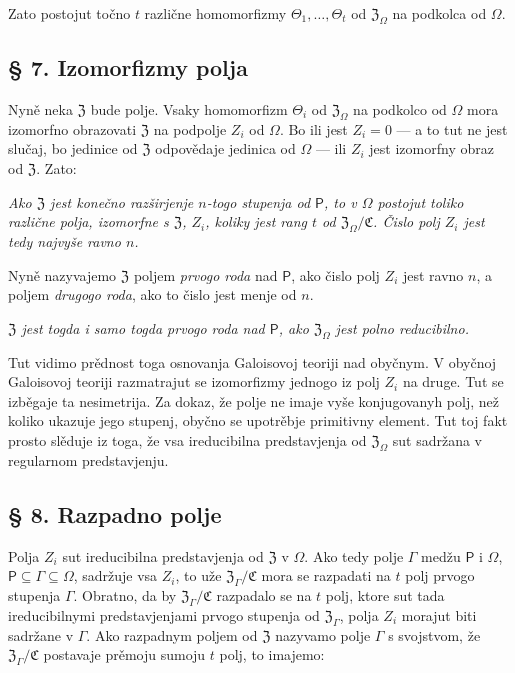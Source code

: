 \documentclass[11pt]{article}
\begin{document}
Zato postojut točno \(t\) različne homomorfizmy \(\Theta_1,\ldots,\Theta_t\) od \(\mathfrak Z_\Omega\) na podkolca od \(\Omega\).

\subsection*{§ 7. Izomorfizmy polja}\label{die-isomorphismen-eines-koerpers}

Nyně neka \(\mathfrak Z\) bude polje. Vsaky homomorfizm \(\Theta_i\) od \(\mathfrak Z_\Omega\) na podkolco od \(\Omega\) mora izomorfno obrazovati \(\mathfrak Z\) na podpolje \(Z_i\) od \(\Omega\). Bo ili jest \(Z_i=0\) --- a to tut ne jest slučaj, bo jedinice od \(\mathfrak Z\) odpovědaje jedinica od \(\Omega\) --- ili \(Z_i\) jest izomorfny obraz od \(\mathfrak Z\). Zato:

\emph{Ako \(\mathfrak Z\) jest konečno razširjenje \(n\)-togo stupenja od \(\mathsf P\), to v \(\Omega\) postojut toliko različne polja, izomorfne s \(\mathfrak Z\), \(Z_i\), koliky jest rang \(t\) od \(\mathfrak Z_\Omega/\mathfrak C\). Čislo polj \(Z_i\) jest tedy najvyše ravno \(n\).}

Nyně nazyvajemo \(\mathfrak Z\) poljem \emph{prvogo roda} nad \(\mathsf P\), ako čislo polj \(Z_i\) jest ravno \(n\), a poljem \emph{drugogo roda}, ako to čislo jest menje od \(n\).

\emph{\(\mathfrak Z\) jest togda i samo togda prvogo roda nad \(\mathsf P\), ako \(\mathfrak Z_\Omega\) jest polno reducibilno.}

Tut vidimo prědnost toga osnovanja Galoisovoj teoriji nad obyčnym. V obyčnoj Galoisovoj teoriji razmatrajut se izomorfizmy jednogo iz polj \(Z_i\) na druge. Tut se izběgaje ta nesimetrija. Za dokaz, že polje ne imaje vyše konjugovanyh polj, než koliko ukazuje jego stupenj, obyčno se upotrěbje primitivny element. Tut toj fakt prosto slěduje iz toga, že vsa ireducibilna predstavjenja od \(\mathfrak Z_\Omega\) sut sadržana v regularnom predstavjenju.

\subsection*{§ 8. Razpadno polje}\label{der-zerfaellungskoerper}

Polja \(Z_i\) sut ireducibilna predstavjenja od \(\mathfrak Z\) v \(\Omega\). Ako tedy polje \(\Gamma\) medžu \(\mathsf P\) i \(\Omega\), \(\mathsf P\subseteq\Gamma\subseteq\Omega\), sadržuje vsa \(Z_i\), to uže \(\mathfrak Z_\Gamma/\mathfrak C\) mora se razpadati na \(t\) polj prvogo stupenja \(\Gamma\). Obratno, da by \(\mathfrak Z_\Gamma/\mathfrak C\) razpadalo se na \(t\) polj, ktore sut tada ireducibilnymi predstavjenjami prvogo stupenja od \(\mathfrak Z_\Gamma\), polja \(Z_i\) morajut biti sadržane v \(\Gamma\). Ako razpadnym poljem od \(\mathfrak Z\) nazyvamo polje \(\Gamma\) s svojstvom, že \(\mathfrak Z_\Gamma/\mathfrak C\) postavaje prěmoju sumoju \(t\) polj, to imajemo:
\end{document}

